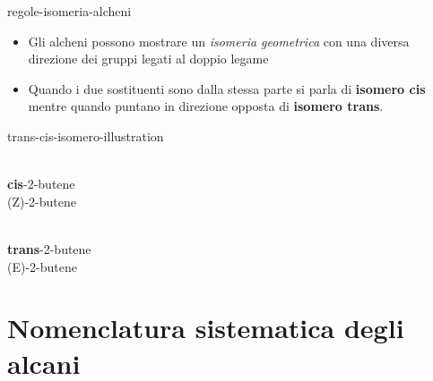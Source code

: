 \documentclass[preview]{standalone}
\begin{document}
\begin{snippet}{regole-isomeria-alcheni}
    \begin{itemize}
        \item Gli alcheni possono mostrare un \textit{isomeria geometrica} con una diversa direzione dei gruppi
        legati al doppio legame
        \item Quando i due sostituenti sono dalla stessa parte si parla di \textbf{isomero cis} mentre quando
        puntano in direzione opposta di \textbf{isomero trans}.
    \end{itemize}
\end{snippet}

\begin{snippet}{trans-cis-isomero-illustration}
    \begin{minipage}{0.5\textwidth}
        \begin{center}
            \\
            \textbf{cis}-2-butene \\
            (Z)-2-butene
        \end{center}
    \end{minipage}
    \begin{minipage}{0.5\textwidth}
        \begin{center}
            \\
            \textbf{trans}-2-butene \\
            (E)-2-butene
        \end{center}
    \end{minipage}
\end{snippet}

\section{Nomenclatura sistematica degli alcani}


\end{document}
